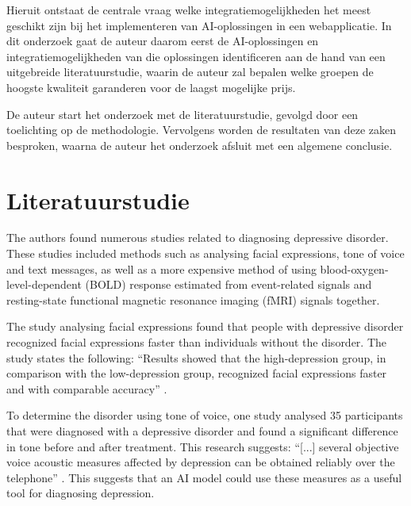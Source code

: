 \documentclass[dutch]{hogent-article}
\begin{document}
  Hieruit ontstaat de centrale vraag welke integratiemogelijkheden het meest geschikt zijn bij het implementeren van AI-oplossingen in een webapplicatie. In dit onderzoek gaat de auteur daarom eerst de AI-oplossingen en integratiemogelijkheden van die oplossingen identificeren aan de hand van een uitgebreide literatuurstudie, waarin de auteur zal bepalen welke groepen de hoogste kwaliteit garanderen voor de laagst mogelijke prijs.
  
  De auteur start het onderzoek met de literatuurstudie, gevolgd door een toelichting op de methodologie. Vervolgens worden de resultaten van deze zaken besproken, waarna de auteur het onderzoek afsluit met een algemene conclusie.
  

\section{Literatuurstudie}%
\label{sec:literature review}


The authors found numerous studies related to diagnosing depressive disorder. These studies included methods such as analysing facial expressions, tone of voice and text messages, as well as a more expensive method of using blood-oxygen-level-dependent (BOLD) response estimated from event-related signals and resting-state functional magnetic resonance imaging (fMRI) signals together.

The study analysing facial expressions found that people with depressive disorder recognized facial expressions faster than individuals without the disorder. The study states the following: “Results showed that the high-depression group, in comparison with the low-depression group, recognized facial expressions faster and with comparable accuracy” \autocite[7]{Wu2012}.

To determine the disorder using tone of voice, one study analysed 35 participants that were diagnosed with a depressive disorder and found a significant difference in tone before and after treatment. This research suggests: “[...] several objective voice acoustic measures affected by depression can be obtained reliably over the telephone” \parencite[3]{Mundt2007}. This suggests that an AI model could use these measures as a useful tool for diagnosing depression.
\end{document}
